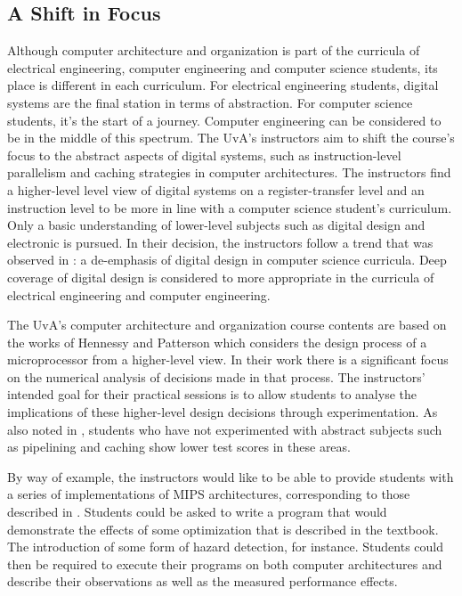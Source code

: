 \documentclass[main.tex]{subfiles}
\begin{document}
\subsection{A Shift in Focus}
Although computer architecture and organization is part of the curricula of electrical engineering, computer engineering and computer science students, its place is different in each curriculum. 
For electrical engineering students, digital systems are the final station in terms of abstraction. For computer science students, it's the start of a journey. Computer engineering can be considered to be in the middle of this spectrum. The UvA's instructors aim to shift the course's focus to the abstract aspects of digital systems, such as instruction-level parallelism and caching strategies in computer architectures. The instructors find a higher-level level view of digital systems on a register-transfer level and an instruction level to be more in line with a computer science student's curriculum. Only a basic understanding of lower-level subjects such as digital design and electronic is pursued. In their decision, the instructors follow a trend that was observed in \cite[p. 205]{cs2013final}: a de-emphasis of digital design in computer science curricula. Deep coverage of digital design is considered to more appropriate in the curricula of electrical engineering and computer engineering. 

The UvA's computer architecture and organization course contents are based on the works of Hennessy and Patterson \cite{hennessy2013computer} which considers the design process of a microprocessor from a higher-level view. In their work there is a significant focus on the numerical analysis of decisions made in that process. The instructors' intended goal for their practical sessions is to allow students to analyse the implications of these higher-level design decisions through experimentation. As also noted in \cite{paharsingh2009novel}, students who have not experimented with abstract subjects such as pipelining and caching show lower test scores in these areas. 

By way of example, the instructors would like to be able to provide students with a series of implementations of MIPS architectures, corresponding to those described in \cite[Ch. 4]{hennessy2013computer}. Students could be asked to write a program that would demonstrate the effects of some optimization that is described in the textbook. The introduction of some form of hazard detection, for instance. Students could then be required to execute their programs on both computer architectures and describe their observations as well as the measured performance effects. 
\end{document}
